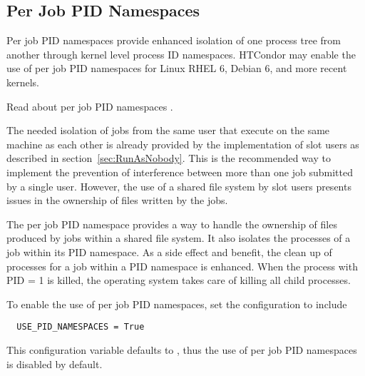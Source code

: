 \subsection{\label{sec:PIDNamespaces}Per Job PID Namespaces} 

Per job PID namespaces provide enhanced isolation of one process
tree from another through kernel level process ID namespaces.
HTCondor may enable the use of per job PID namespaces for 
Linux RHEL 6, Debian 6, and more recent kernels.

Read about per job PID namespaces .

The needed isolation of jobs from the same user that execute on the
same machine as each other is already provided by the implementation
of slot users as described in section~\ref{sec:RunAsNobody}.
This is the recommended way to implement the prevention of interference
between more than one job submitted by a single user.
However, the use of a shared file system by slot users presents
issues in the ownership of files written by the jobs.

The per job PID namespace provides a way to handle the ownership
of files produced by jobs within a shared file system.
It also isolates the processes of a job within its PID namespace.
As a side effect and benefit, the clean up of processes for a job
within a PID namespace is enhanced. 
When the process with PID = 1 is killed, 
the operating system takes care of killing all child processes.

To enable the use of per job PID namespaces, 
set the configuration to include

\begin{verbatim}
  USE_PID_NAMESPACES = True
\end{verbatim}

This configuration variable defaults to ,
thus the use of per job PID namespaces is disabled by default.
